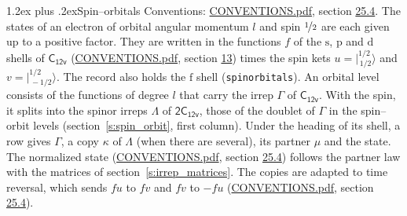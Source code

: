 \documentclass[10pt,a4paper]{article}
\makeatletter
\renewcommand\section{\@startsection{section}{1}{\z@}{-3ex plus -1ex minus -.2ex}%
  {1.2ex plus .2ex}{\normalfont\large\sffamily\bfseries\color{parttitle}}}
\numberwithin{equation}{section}
\newcommand{\grp}[1]{\mathsf{#1}}
\newcommand{\orbital}[1]{\mathrm{#1}}
\newcommand{\mult}{\kappa}
\newcommand{\intx}{\mu}
\newcommand{\jm}[2]{\bigl\lvert{}^{#1}_{\,#2}\bigr\rangle}
\makeatother
\begin{document}
\section{Spin--orbitals}\label{s:spin_orbitals}
Conventions: \href{../../CONVENTIONS.pdf}{CONVENTIONS.pdf}, section \href{../../CONVENTIONS.pdf\#conv.25.4}{25.4}.
\leavevmode\label{n:index.orbital.l}The states of an electron of orbital angular momentum $l$ and spin $\nicefrac{1}{2}$ are each given up to a positive factor. \label{n:local.spinor.uv}\label{n:local.function.f}They are written in the functions $f$ of the $\orbital{s}$, $\orbital{p}$ and $\orbital{d}$ shells of \href{../../../rotation/data/pdf/C12v.pdf}{$\grp{C_{12v}}$} (\href{../../CONVENTIONS.pdf}{CONVENTIONS.pdf}, section \href{../../../rotation/CONVENTIONS.pdf\#conv.13}{13}) times the spin kets $u = \jm{1/2}{1/2}$ and $v = \jm{1/2}{-1/2}$. The record also holds the $\orbital{f}$ shell (\texttt{spinorbitals}). An orbital level consists of the functions of degree $l$ that carry the irrep $\Gamma$ of \href{../../../rotation/data/pdf/C12v.pdf}{$\grp{C_{12v}}$}. With the spin, it splits into the spinor irreps $\Lambda$ of $\grp{2C_{12v}}$, those of the doublet of $\Gamma$ in the spin--orbit levels (section~\ref{s:spin_orbit}, first column). \label{n:head.state}Under the heading of its shell, a row gives $\Gamma$, a copy $\mult$ of $\Lambda$ (when there are several), its partner $\intx$ and the state. The normalized state (\href{../../CONVENTIONS.pdf}{CONVENTIONS.pdf}, section \href{../../CONVENTIONS.pdf\#conv.25.4}{25.4}) follows the partner law with the matrices of section~\ref{s:irrep_matrices}. The copies are adapted to time reversal, which sends $f u$ to $f v$ and $f v$ to $-f u$ (\href{../../CONVENTIONS.pdf}{CONVENTIONS.pdf}, section \href{../../CONVENTIONS.pdf\#conv.25.4}{25.4}).
\end{document}
